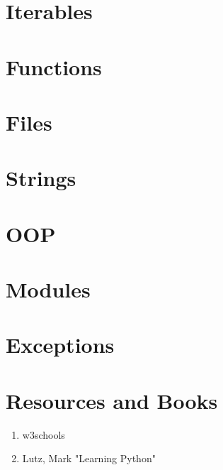 \documentclass[a4paper,12pt,titlepage]{article} %
\begin{document}
\section{Iterables}

\newpage
\section{Functions}

\newpage
\section{Files}

\newpage
\section{Strings}

\newpage
\section{OOP}

\newpage
\section{Modules}

\newpage
\section{Exceptions}

\newpage
\section{Resources and Books}

\begin{enumerate}
	\item w3schools
	\item Lutz, Mark "Learning Python"
\end{enumerate}

\end{document}
